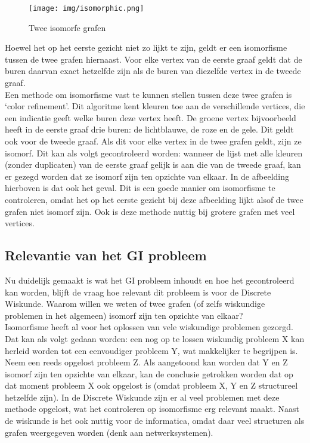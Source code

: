 \documentclass{article}
\begin{document}
\begin{wrapfigure}{r}{0.5\textwidth}
\renewcommand{\figurename}{Figuur}
\begin{center}
\texttt{[image: img/isomorphic.png]}
\end{center}
\caption{Twee isomorfe grafen}
\end{wrapfigure}

Hoewel het op het eerste gezicht niet zo lijkt te zijn, geldt er een isomorfisme tussen de twee grafen hiernaast. Voor elke vertex van de eerste graaf geldt dat de buren daarvan exact hetzelfde zijn als de buren van diezelfde vertex in de tweede graaf.\\

Een methode om isomorfisme vast te kunnen stellen tussen deze twee grafen is ‘color refinement’. Dit algoritme kent kleuren toe aan de verschillende vertices, die een indicatie geeft welke buren deze vertex heeft. De groene vertex bijvoorbeeld heeft in de eerste graaf drie buren: de lichtblauwe, de roze en de gele. Dit geldt ook voor de tweede graaf. Als dit voor elke vertex in de twee grafen geldt, zijn ze isomorf. Dit kan als volgt gecontroleerd worden: wanneer de lijst met alle kleuren (zonder duplicaten) van de eerste graaf gelijk is aan die van de tweede graaf, kan er gezegd worden dat ze isomorf zijn ten opzichte van elkaar. In de afbeelding hierboven is dat ook het geval.
Dit is een goede manier om isomorfisme te controleren, omdat het op het eerste gezicht bij deze afbeelding lijkt alsof de twee grafen niet isomorf zijn. Ook is deze methode nuttig bij grotere grafen met veel vertices.

\subsection{Relevantie van het GI probleem}
Nu duidelijk gemaakt is wat het GI probleem inhoudt en hoe het gecontroleerd kan worden, blijft de vraag hoe relevant dit probleem is voor de Discrete Wiskunde. Waarom willen we weten of twee grafen (of zelfs wiskundige problemen in het algemeen) isomorf zijn ten opzichte van elkaar?\\

Isomorfisme heeft al voor het oplossen van vele wiskundige problemen gezorgd. Dat kan als volgt gedaan worden: een nog op te lossen wiskundig probleem X kan herleid worden tot een eenvoudiger probleem Y, wat makkelijker te begrijpen is. Neem een reeds opgelost probleem Z. Als aangetoond kan worden dat Y en Z isomorf zijn ten opzichte van elkaar, kan de conclusie getrokken worden dat op dat moment probleem X ook opgelost is (omdat probleem X, Y en Z structureel hetzelfde zijn). In de Discrete Wiskunde zijn er al veel problemen met deze methode opgelost, wat het controleren op isomorfisme erg relevant maakt.
Naast de wiskunde is het ook nuttig voor de informatica, omdat daar veel structuren als grafen weergegeven worden (denk aan netwerksystemen).
\end{document}
